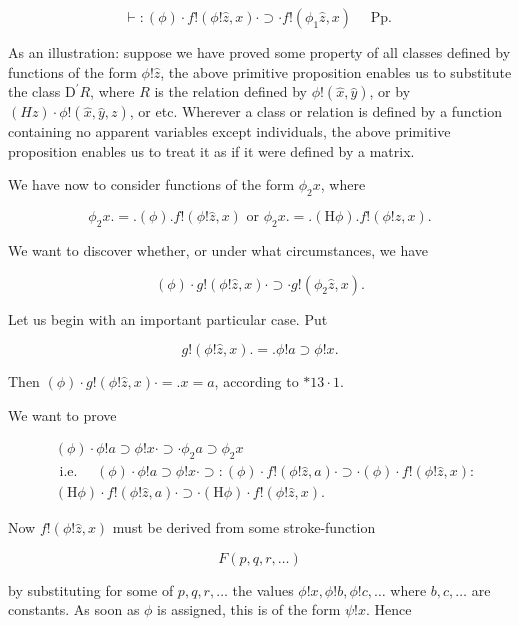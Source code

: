 \documentclass[10pt]{article}
\begin{document}
$$
\vdash:(\phi) \cdot f!(\phi!\hat{z}, x) \cdot \supset \cdot f!\left(\phi_{1} \hat{z}, x\right) \quad \text { Pp. }
$$

As an illustration: suppose we have proved some property of all classes defined by functions of the form $\phi!\hat{z}$, the above primitive proposition enables us to substitute the class $\mathrm{D}^{\prime} R$, where $R$ is the relation defined by $\phi!(\hat{x}, \hat{y})$, or by $(H z) \cdot \phi!(\hat{x}, \hat{y}, z)$, or etc. Wherever a class or relation is defined by a function containing no apparent variables except individuals, the above primitive proposition enables us to treat it as if it were defined by a matrix.

We have now to consider functions of the form $\phi_{2} x$, where

$$
\phi_{2} x .=.(\phi) . f!(\phi!\hat{z}, x) \text { or } \phi_{2} x .=.(\mathrm{H} \phi) . f!(\phi!\hat{z}, x) .
$$

We want to discover whether, or under what circumstances, we have


\begin{equation*}
(\phi) \cdot g!(\phi!\hat{z}, x) \cdot \supset \cdot g!\left(\phi_{2} \hat{z}, x\right) . \tag{A}
\end{equation*}


Let us begin with an important particular case. Put

$$
g!(\phi!\hat{z}, x) .=. \phi!a \supset \phi!x .
$$

Then $(\phi) \cdot g!(\phi!\hat{z}, x) \cdot=. x=a$, according to $* 13 \cdot 1$.

We want to prove

$$
\begin{aligned}
&(\phi) \cdot \phi!a \supset \phi!x \cdot \supset \cdot \phi_{2} a \supset \phi_{2} x \\
& \text { i.e. } \quad(\phi) \cdot \phi!a \supset \phi!x \cdot \supset:(\phi) \cdot f!(\phi!\hat{z}, a) \cdot \supset \cdot(\phi) \cdot f!(\phi!\hat{z}, x): \\
&(\mathrm{H} \phi) \cdot f!(\phi!\hat{z}, a) \cdot \supset \cdot(\mathrm{H} \phi) \cdot f!(\phi!\hat{z}, x) .
\end{aligned}
$$

Now $f!(\phi!\hat{z}, x)$ must be derived from some stroke-function

$$
F(p, q, r, \ldots)
$$

by substituting for some of $p, q, r, \ldots$ the values $\phi!x, \phi!b, \phi!c, \ldots$ where $b, c, \ldots$ are constants. As soon as $\phi$ is assigned, this is of the form $\psi!x$. Hence
\end{document}
